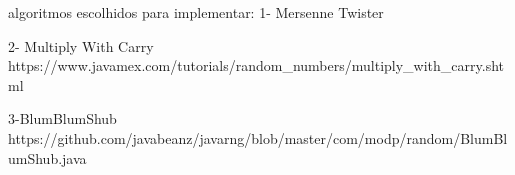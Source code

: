 \documentclass[openany]{ufsctex/ufsctex}
\begin{document}
    \folhaderosto
    \sumario

    algoritmos escolhidos para implementar:
    1- Mersenne Twister
    
    2- Multiply With Carry    
    https://www.javamex.com/tutorials/random_numbers/multiply_with_carry.shtml
    
    3-BlumBlumShub
    https://github.com/javabeanz/javarng/blob/master/com/modp/random/BlumBlumShub.java
    
    
\end{document}
